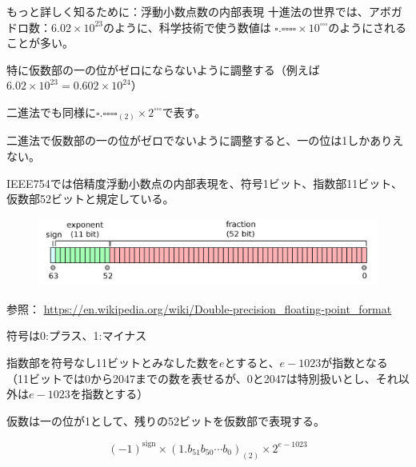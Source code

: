 \documentclass[unicode,lualatex,aspectratio=169]{beamer}
\begin{document}
\begin{frame}[fragile]{もっと詳しく知るために：浮動小数点数の内部表現}
  十進法の世界では、アボガドロ数：$6.02\times 10^{23}$のように、科学技術で使う数値は
  $\square.\square\square\square\square \times 10^{\square\square\square}$のようにされることが多い。

  特に仮数部の一の位がゼロにならないように調整する（例えば$6.02\times 10^{23} =
  0.602 \times 10^{24}$）
  
  二進法でも同様に$\square.\square\square\square\square_{(2)} \times 2^{\square\square\square}$で表す。

  二進法で仮数部の一の位がゼロでないように調整すると、一の位は1しかありえない。

\end{frame}
\begin{frame}[fragile]
  IEEE754では倍精度浮動小数点の内部表現を、符号1ビット、指数部11ビット、仮数部52ビットと規定している。
\begin{figure}[!ht]
\includegraphics[scale=.1]{img/IEEE_754_Double_Floating_Point_Format.png}
\end{figure}

{\tiny 参照： \url{https://en.wikipedia.org/wiki/Double-precision\_floating-point\_format}}

符号は0:プラス、1:マイナス

指数部を符号なし11ビットとみなした数を$e$とすると、$e-1023$が指数となる（11ビットでは0から2047までの数を表せるが、0と2047は特別扱いとし、それ以外は$e-1023$を指数とする）

仮数は一の位が1として、残りの52ビットを仮数部で表現する。

\[ (-1)^\mathrm{sign} \times (1.b_{51} b_{50} \cdots b_{0})_{(2)} \times 2^{e-1023} \]
\end{frame}
\end{document}
